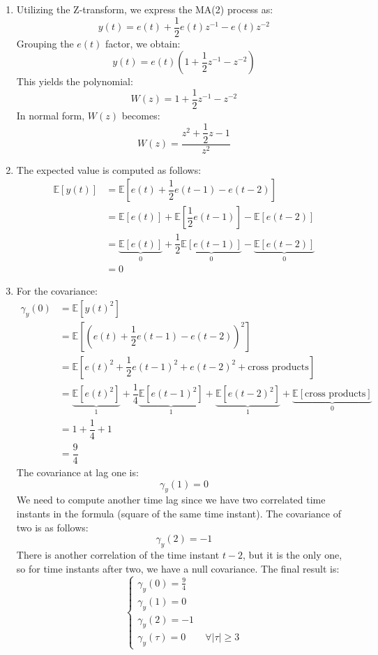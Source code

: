 \begin{enumerate}
    \item Utilizing the Z-transform, we express the MA(2) process as:
        \[y(t)=e(t)+\dfrac{1}{2}e(t)z^{-1}-e(t)z^{-2}\]
        Grouping the $e(t)$ factor, we obtain:
        \[y(t)=e(t)\left(1+\dfrac{1}{2}z^{-1}-z^{-2}\right)\]
        This yields the polynomial:
        \[W(z)=1+\dfrac{1}{2}z^{-1}-z^{-2}\]
        In normal form, $W(z)$ becomes:
        \[W(z)=\dfrac{z^2+\dfrac{1}{2}z-1}{z^2}\]
    \item The expected value is computed as follows:
        \begin{align*}
            \mathbb{E}\left[y(t)\right]     &= \mathbb{E}\left[e(t)+\dfrac{1}{2}e(t-1)-e(t-2)\right] \\
                                            &= \mathbb{E}\left[e(t)\right]+\mathbb{E}\left[\dfrac{1}{2}e(t-1)\right]-\mathbb{E}\left[e(t-2)\right] \\
                                            &= \underbrace{\mathbb{E}\left[e(t)\right]}_0 +\dfrac{1}{2}\underbrace{\mathbb{E}\left[e(t-1)\right]}_0 -\underbrace{\mathbb{E}\left[e(t-2)\right]}_0  \\
                                            &= 0
        \end{align*}
    \item For the covariance:
        \begin{align*}
            \gamma_y(0)     &= \mathbb{E}\left[y(t)^2\right] \\
                            &= \mathbb{E}\left[\left( e(t)+\dfrac{1}{2}e(t-1)-e(t-2) \right)^2\right] \\
                            &= \mathbb{E}\left[ e(t)^2 + \dfrac{1}{2}e(t-1)^2 + e(t-2)^2  + \text{cross products} \right] \\
                            &= \underbrace{\mathbb{E}\left[ e(t)^2 \right]}_1  + \dfrac{1}{4}\underbrace{\mathbb{E}\left[e(t-1)^2\right]}_1  + \underbrace{\mathbb{E}\left[e(t-2)^2\right]}_1  + \underbrace{\mathbb{E}\left[\text{cross products}\right]}_0  \\
                            &= 1  + \dfrac{1}{4} + 1\\
                            &= \dfrac{9}{4}
        \end{align*}
        The covariance at lag one is:
        \[\gamma_y(1)=0\]
        We need to compute another time lag since we have two correlated time instants in the formula (square of the same time instant).
        The covariance of two is as follows:
        \[\gamma_y(2)=-1\]
        There is another correlation of the time instant $t-2$, but it is the only one, so for time instants after two, we have a null covariance.
        The final result is:
        \[\begin{cases}
            \gamma_y(0)=\frac{9}{4} \\
            \gamma_y(1)=0 \\
            \gamma_y(2)=-1 \\
            \gamma_y(\tau)=0 \qquad \forall\left\lvert \tau\right\rvert \geq 3
        \end{cases}\]
\end{enumerate}